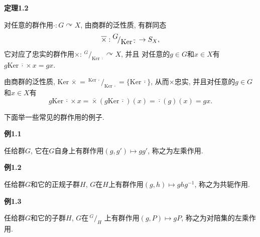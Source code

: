 \documentclass[UTF8]{ctexart}
\begin{document}
\hypertarget{sec:定理1.2}{}
\noindent\textbf{定理1.2}

对任意的群作用$\cdot:G\curvearrowright X$, 由商群的泛性质, 有群同态
\vspace{3pt}
\[
    \overline{\times}:\,\!^{\displaystyle G}\!
    /_{\displaystyle\mathrm{Ker}\,\overline{\cdot}}\,\to S_X,\\[3pt]
\]
它对应了忠实的群作用$\times:\,\!^{\displaystyle G}\!
/_{\displaystyle\mathrm{Ker}\,\overline{\cdot}}\curvearrowright X$, 并且
对任意的$g\in G$和$x\in X$有$g\mathrm{Ker}\,\overline{\cdot}\times x=gx$.

\vspace{3pt}

由商群的泛性质, $\mathrm{Ker}\,\overline{\times}=
\,\!^{\displaystyle\mathrm{Ker}\,\overline{\cdot}}\!/_
{\displaystyle\mathrm{Ker}\,\overline{\cdot}}=\{\mathrm{Ker}\,\overline{\cdot}\}$,
从而$\times$忠实, 并且对任意的$g\in G$和$x\in X$有
\vspace{5pt}
\begin{equation*}
    g\mathrm{Ker}\,\overline{\cdot}\times x=
    \overline{\times}(g\mathrm{Ker}\,\overline{\cdot})(x)=
    \overline{\cdot}(g)(x)=gx.
\tag*{\qedsymbol}\end{equation*}

\vspace{15pt}

下面举一些常见的群作用的例子.

\vspace{10pt}

\hypertarget{sec:例1.1}{}
\noindent\textbf{例1.1}

任给群$G$, 它在$G$自身上有群作用$(g,g')\mapsto gg'$, 称之为左乘作用.

\vspace{10pt}

\hypertarget{sec:例1.2}{}
\noindent\textbf{例1.2}

任给群$G$和它的正规子群$H$, $G$在$H$上有群作用$(g,h)\mapsto ghg^{-1}$, 称之为共轭作用.

\vspace{10pt}

\hypertarget{sec:例1.3}{}
\noindent\textbf{例1.3}

任给群$G$和它的子群$H$, $G$在$\,\!^{\displaystyle G}\!/_{\displaystyle H}$
上有群作用$(g,P)\mapsto gP$, 称之为对陪集的左乘作用.





\newpage
\end{document}
